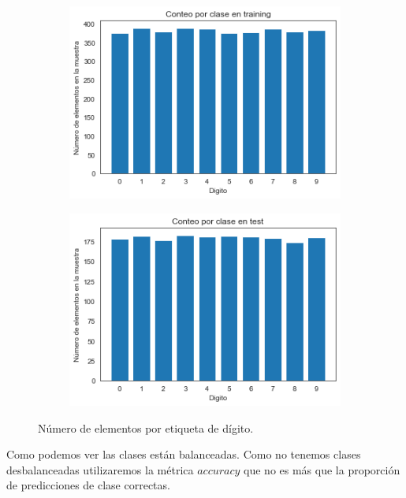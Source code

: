 \documentclass[11pt,a4paper]{article}
\theoremstyle{definition}
\begin{document}
	\begin{figure}[H]
		\centering
		\begin{subfigure}{.5\textwidth}
  		\centering
 		\includegraphics[width=1\textwidth]{images/conteo_por_clase}
  		\label{fig:sub1}
		\end{subfigure}%
		\begin{subfigure}{.5\textwidth}
  		\centering
  		\includegraphics[width=1\textwidth]{images/conteo_por_clase_test}
  		\label{fig:sub2}
		\end{subfigure}
		\caption{Número de elementos por etiqueta de dígito.}
		\label{fig:test}
	\end{figure}
	
	Como podemos ver las clases están balanceadas. Como no tenemos clases desbalanceadas utilizaremos la métrica $accuracy$ que no es más que la proporción de predicciones de clase correctas.
	
\end{document}
